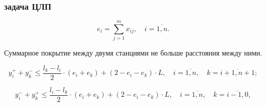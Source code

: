 \begin{frame}
    \frametitle{задача ЦЛП}
    \begin{minipage}[t]{0.5\linewidth}
        \begin{equation}
            \label{eq:part3_ei}
            e_i =  \sum\limits_{j=1}^m x_{ij}, \quad i = \overline{1,n}. 
          \end{equation}
    \end{minipage}

    \begin{minipage}[t]{0.5\linewidth}
        
    \bigskip
    \bigskip
    \bigskip
    Суммарное покрытие между двумя станциями не больше расстояния между ними.
          

    \end{minipage}
    \hfill
    \begin{minipage}[t]{0.47\linewidth}
        
    \end{minipage}

    \bigskip
    \fontsize{8pt}{7.2}\selectfont
    \begin{equation}
        \label{eq:part3_yi_3}
        y_i^+ + y_k^- \leq \frac{l_k - l_i}{2} \cdot (e_i + e_k ) + (2 - e_i - e_k ) \cdot L, \quad i = \overline{1,n},  \quad k = \overline{i+1,n+1};
      \end{equation}
      
      \begin{equation}
        \label{eq:part3_yi_4}
        y_i^- + y_k^+  \leq \frac{l_i-l_k}{2} \cdot (e_i + e_k) + (2 - e_i - e_k) \cdot L, \quad i = \overline{1,n}, \quad k = \overline{i-1,0},
      \end{equation}

\end{frame}

